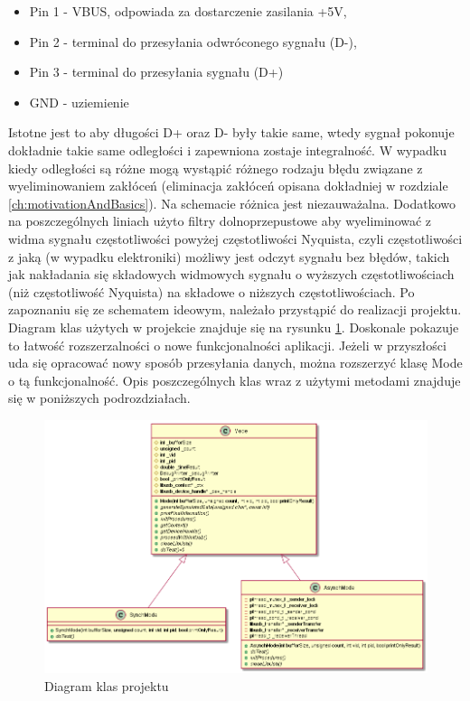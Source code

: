 \documentclass{BscUS}
\begin{document}
\begin{itemize}
\item Pin 1 - VBUS, odpowiada za dostarczenie zasilania +5V,
\item Pin 2 - terminal do przesyłania odwróconego sygnału (D-),
\item Pin 3 - terminal do przesyłania sygnału (D+)
\item GND - uziemienie
\end{itemize}
\noindent Istotne jest to aby długości D+ oraz D- były takie same, wtedy sygnał pokonuje dokładnie takie same odległości i zapewniona zostaje integralność. W wypadku kiedy odległości są różne mogą wystąpić różnego rodzaju błędu związane z wyeliminowaniem zakłóceń (eliminacja zakłóceń opisana dokładniej w rozdziale \ref{ch:motivationAndBasics}). Na schemacie różnica jest niezauważalna. Dodatkowo na poszczególnych liniach użyto filtry dolnoprzepustowe aby wyeliminować z widma sygnału częstotliwości powyżej częstotliwości Nyquista, czyli częstotliwości z jaką (w wypadku elektroniki) możliwy jest odczyt sygnału bez błędów, takich jak nakładania się składowych widmowych sygnału o wyższych częstotliwościach (niż częstotliwość Nyquista) na składowe o niższych częstotliwościach.
\newline
\indent Po zapoznaniu się ze schematem ideowym, należało przystąpić do realizacji projektu. Diagram klas użytych w projekcie znajduje się na rysunku \ref{fig:classDiagram}. Doskonale pokazuje to łatwość rozszerzalności o nowe funkcjonalności aplikacji. Jeżeli w przyszłości uda się opracować nowy sposób przesyłania danych, można rozszerzyć klasę Mode o tą funkcjonalność. Opis poszczególnych klas wraz z użytymi metodami znajduje się w poniższych podrozdziałach.
\begin{figure}[H]
\centering
\includegraphics[width=1\textwidth]{./img/classDiagram}
\caption{Diagram klas projektu}
\label{fig:classDiagram}
\end{figure}
\end{document}
